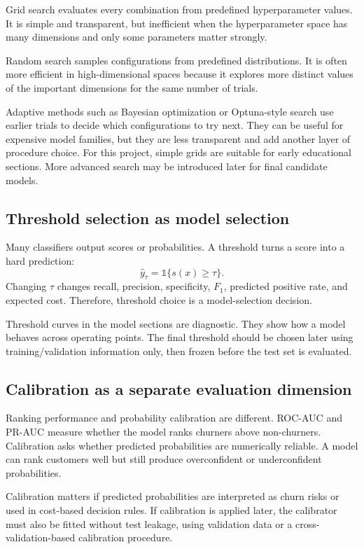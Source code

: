 Grid search evaluates every combination from predefined hyperparameter values. It is simple and transparent, but inefficient when the hyperparameter space has many dimensions and only some parameters matter strongly.

Random search samples configurations from predefined distributions. It is often more efficient in high-dimensional spaces because it explores more distinct values of the important dimensions for the same number of trials.

Adaptive methods such as Bayesian optimization or Optuna-style search use earlier trials to decide which configurations to try next. They can be useful for expensive model families, but they are less transparent and add another layer of procedure choice. For this project, simple grids are suitable for early educational sections. More advanced search may be introduced later for final candidate models.

\subsection{Threshold selection as model selection}

Many classifiers output scores or probabilities. A threshold turns a score into a hard prediction:
\[
\hat{y}_{\tau}
=
\mathbb{1}\{s(x)\geq \tau\}.
\]
Changing \(\tau\) changes recall, precision, specificity, \(F_1\), predicted positive rate, and expected cost. Therefore, threshold choice is a model-selection decision.

Threshold curves in the model sections are diagnostic. They show how a model behaves across operating points. The final threshold should be chosen later using training/validation information only, then frozen before the test set is evaluated.

\subsection{Calibration as a separate evaluation dimension}

Ranking performance and probability calibration are different. ROC-AUC and PR-AUC measure whether the model ranks churners above non-churners. Calibration asks whether predicted probabilities are numerically reliable. A model can rank customers well but still produce overconfident or underconfident probabilities.

Calibration matters if predicted probabilities are interpreted as churn risks or used in cost-based decision rules. If calibration is applied later, the calibrator must also be fitted without test leakage, using validation data or a cross-validation-based calibration procedure.

